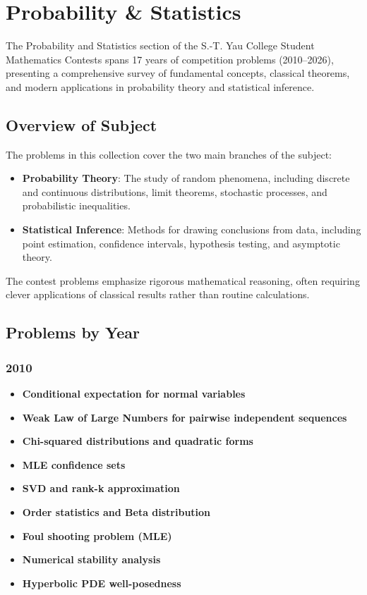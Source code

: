 \section{Probability \& Statistics}
\label{sec:probability}

The Probability and Statistics section of the S.-T. Yau College Student Mathematics Contests spans 17 years of competition problems (2010--2026), presenting a comprehensive survey of fundamental concepts, classical theorems, and modern applications in probability theory and statistical inference.

\subsection{Overview of Subject}

The problems in this collection cover the two main branches of the subject:
\begin{itemize}
    \item \textbf{Probability Theory}: The study of random phenomena, including discrete and continuous distributions, limit theorems, stochastic processes, and probabilistic inequalities.
    \item \textbf{Statistical Inference}: Methods for drawing conclusions from data, including point estimation, confidence intervals, hypothesis testing, and asymptotic theory.
\end{itemize}

The contest problems emphasize rigorous mathematical reasoning, often requiring clever applications of classical results rather than routine calculations.

\subsection{Problems by Year}

\subsubsection*{2010}
\begin{itemize}
    \item \textbf{Conditional expectation for normal variables}
    \item \textbf{Weak Law of Large Numbers for pairwise independent sequences}
    \item \textbf{Chi-squared distributions and quadratic forms}
    \item \textbf{MLE confidence sets}
    \item \textbf{SVD and rank-k approximation}
    \item \textbf{Order statistics and Beta distribution}
    \item \textbf{Foul shooting problem (MLE)}
    \item \textbf{Numerical stability analysis}
    \item \textbf{Hyperbolic PDE well-posedness}
\end{itemize}

